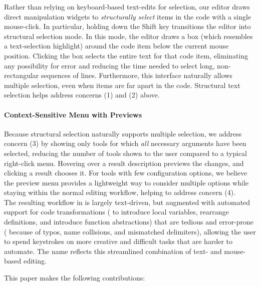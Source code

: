 Rather than relying on keyboard-based text-edits for selection, our editor draws
direct manipulation widgets to \emph{structurally select} items in the code with
a single mouse-click. In particular, holding down the Shift key transitions the
editor into structural selection mode. In this mode, the editor draws a box
(which resembles a text-selection highlight) around the code item below the
current mouse position. Clicking the box selects the entire text for that code
item, eliminating any possibility for error and reducing the time needed to
select long, non-rectangular sequences of lines. Furthermore, this interface naturally
allows multiple selection, even when items are far apart in the code. Structural
text selection helps address concerns (1) and (2) above.

\paragraph{Context-Sensitive Menu with Previews}

Because structural selection naturally supports multiple selection, we
address concern (3) by showing only tools for which \emph{all} necessary
arguments have been selected, reducing the number of tools shown to the user
compared to a typical right-click menu.
Hovering over a result description previews the changes, and
clicking a result chooses it. For tools with few
configuration options, we believe the preview menu provides a lightweight way to
consider multiple options while staying within the normal editing workflow,
helping to address concern (4).
\\

\noindent The resulting workflow in \deuce{} is largely
text-driven, but augmented with automated support for code transformations
(\eg{} to introduce local variables, rearrange definitions, and introduce
function abstractions) that are tedious and error-prone (\eg{} because of typos,
name collisions, and mismatched delimiters), allowing the user to spend
keystrokes on more creative and difficult tasks that are harder to automate.
The name \deuce{} reflects this streamlined combination of text- and mouse-based
editing.


This paper makes the following contributions:

